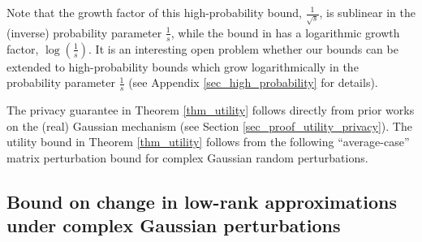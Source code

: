 \documentclass[11pt,letterpaper]{article}
\begin{document}
%
Note that the growth factor of this high-probability bound, $\frac{1}{\sqrt{s}}$, is sublinear in the (inverse) probability parameter $\frac{1}{s}$, while the bound in \cite{dwork2014analyze} has a logarithmic growth factor, $\log(\frac{1}{s})$.
%
%
It is an interesting open problem whether our bounds can be extended to high-probability bounds which grow logarithmically in the probability parameter $\frac{1}{s}$ (see Appendix \ref{sec_high_probability} for details).
%
\color{black}

The privacy guarantee in Theorem \ref{thm_utility} follows directly from prior works on the (real) Gaussian mechanism (see Section \ref{sec_proof_utility_privacy}).
%
The utility bound in Theorem \ref{thm_utility} follows from the following ``average-case'' matrix perturbation bound for complex Gaussian random perturbations.
%

\subsection{Bound on change in low-rank approximations under complex Gaussian perturbations}
\end{document}
